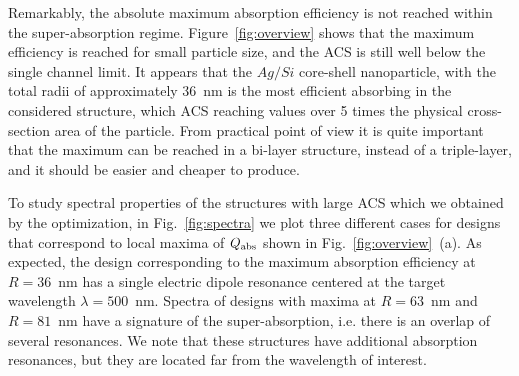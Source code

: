 \documentclass[aps,prl,twocolumn,showpacs,superscriptaddress,groupedaddress]{revtex4-1}
\begin{document}
Remarkably, the absolute maximum absorption efficiency is not reached
within the super-absorption regime. Figure~\ref{fig:overview} shows
that the maximum efficiency is reached for small particle size, and
the ACS is still well below the single channel limit. It appears that
the $Ag/Si$ core-shell nanoparticle, with the total radii of
approximately 36~nm is the most efficient absorbing in the considered
structure, which ACS reaching values over 5 times the physical
cross-section area of the particle.  From practical point of view it
is quite important that the maximum can be reached in a bi-layer
structure, instead of a triple-layer, and it should be easier and
cheaper to produce.

\begin{figure}
\end{figure}
To study spectral properties of the structures with large ACS which we
obtained by the optimization, in Fig.~\ref{fig:spectra} we plot three
different cases for designs that correspond to local maxima of $Q_{\rm
  abs}$ shown in Fig.~\ref{fig:overview}~(a).  As expected, the design
corresponding to the maximum absorption efficiency at $R=36$~nm has a
single electric dipole resonance centered at the target wavelength
$\lambda=500$~nm. Spectra of designs with maxima at $R=63$~nm and
$R=81$~nm have a signature of the super-absorption, i.e. there is an
overlap of several resonances.  We note that these structures have
additional absorption resonances, but they are located far from the
wavelength of interest.
\end{document}
